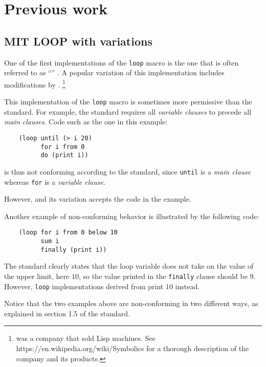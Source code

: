 \section{Previous work}

\subsection{MIT LOOP with variations}
\label{sec-mit-loop}

One of the first implementations of the \commonlisp{} \texttt{loop}
macro is the one that is often referred to as ``\mitloop{}''
\cite{Burke:Moon:MIT.loop}.  A popular variation of this
implementation includes modifications by \symbolics{}.%
\footnote{\symbolics{} was a company that sold Lisp machines.  See
  https://en.wikipedia.org/wiki/Symbolics for a thorough description
  of the company and its products.}

This implementation of the \texttt{loop} macro is sometimes more
permissive than the \commonlisp{} standard.  For example, the standard
requires all \emph{variable clauses} to precede all \emph{main
  clauses}.  Code such as the one in this example:

\begin{verbatim}
    (loop until (> i 20)
          for i from 0
          do (print i))
\end{verbatim}

\noindent
is thus not conforming according to the standard, since \texttt{until}
is a \emph{main clause} whereas \texttt{for} is a \emph{variable
  clause}.

However, \mitloop{} and its variation accepts the code in the example.

Another example of non-conforming behavior is illustrated by the
following code:

\begin{verbatim}
    (loop for i from 0 below 10
          sum i
          finally (print i))
\end{verbatim}

The \commonlisp{} standard clearly states that the loop variable does
not take on the value of the upper limit, here $10$, so the value
printed in the \texttt{finally} clause should be $9$.  However,
\texttt{loop} implementations derived from \mitloop{} print $10$
instead.

Notice that the two examples above are non-conforming in two different
ways, as explained in section 1.5 of the \commonlisp{} standard.

